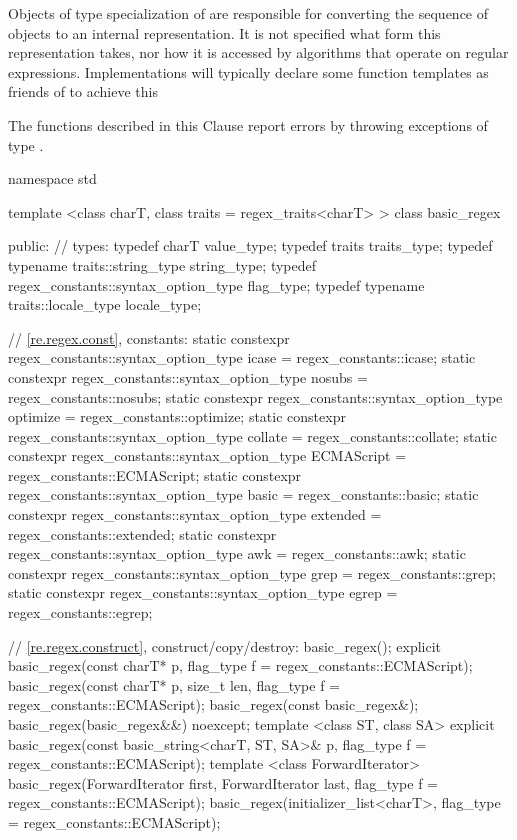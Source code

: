 \pnum
Objects of type specialization of  are responsible for
converting the sequence of  objects to an internal
representation. It is not specified what form this representation
takes, nor how it is accessed by algorithms that operate on regular
expressions. \enternote Implementations will typically declare
some function templates as friends of  to achieve
this \exitnote

\pnum
{}%
The functions described in this Clause report errors by throwing
exceptions of type .

%
\begin{codeblock}
namespace std {
  template <class charT,
            class traits = regex_traits<charT> >
  class basic_regex {
  public:
    // types:
    typedef          charT                                value_type;
    typedef          traits                               traits_type;
    typedef typename traits::string_type                  string_type;
    typedef          regex_constants::syntax_option_type  flag_type;
    typedef typename traits::locale_type                  locale_type;

    // \ref{re.regex.const}, constants:
    static constexpr regex_constants::syntax_option_type
      icase = regex_constants::icase;
    static constexpr regex_constants::syntax_option_type
      nosubs = regex_constants::nosubs;
    static constexpr regex_constants::syntax_option_type
      optimize = regex_constants::optimize;
    static constexpr regex_constants::syntax_option_type
      collate = regex_constants::collate;
    static constexpr regex_constants::syntax_option_type
      ECMAScript = regex_constants::ECMAScript;
    static constexpr regex_constants::syntax_option_type
      basic = regex_constants::basic;
    static constexpr regex_constants::syntax_option_type
      extended = regex_constants::extended;
    static constexpr regex_constants::syntax_option_type
      awk = regex_constants::awk;
    static constexpr regex_constants::syntax_option_type
      grep = regex_constants::grep;
    static constexpr regex_constants::syntax_option_type
      egrep = regex_constants::egrep;

    // \ref{re.regex.construct}, construct/copy/destroy:
    basic_regex();
    explicit basic_regex(const charT* p,
      flag_type f = regex_constants::ECMAScript);
    basic_regex(const charT* p, size_t len, flag_type f = regex_constants::ECMAScript);
    basic_regex(const basic_regex&);
    basic_regex(basic_regex&&) noexcept;
    template <class ST, class SA>
      explicit basic_regex(const basic_string<charT, ST, SA>& p, 
                           flag_type f = regex_constants::ECMAScript);
    template <class ForwardIterator>
      basic_regex(ForwardIterator first, ForwardIterator last, 
                  flag_type f = regex_constants::ECMAScript);
    basic_regex(initializer_list<charT>,
      flag_type = regex_constants::ECMAScript);

}}
\end{codeblock}
